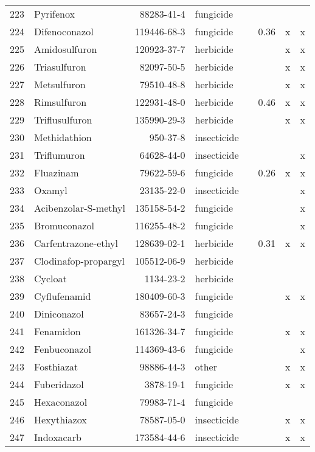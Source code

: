 \begin{longtable}{lp{4cm}rlp{1cm}p{1.5cm}p{1.5cm}p{1cm}}
  223 & Pyrifenox & 88283-41-4 & fungicide &  &  &  &  \\ 
  224 & Difenoconazol & 119446-68-3 & fungicide &  & 0.36 & x & x \\ 
  225 & Amidosulfuron & 120923-37-7 & herbicide &  &  & x & x \\ 
  226 & Triasulfuron & 82097-50-5 & herbicide &  &  & x & x \\ 
  227 & Metsulfuron & 79510-48-8 & herbicide &  &  & x & x \\ 
  228 & Rimsulfuron & 122931-48-0 & herbicide &  & 0.46 & x & x \\ 
  229 & Triflusulfuron & 135990-29-3 & herbicide &  &  & x & x \\ 
  230 & Methidathion & 950-37-8 & insecticide &  &  &  &  \\ 
  231 & Triflumuron & 64628-44-0 & insecticide &  &  &  & x \\ 
  232 & Fluazinam & 79622-59-6 & fungicide &  & 0.26 & x & x \\ 
  233 & Oxamyl & 23135-22-0 & insecticide &  &  &  & x \\ 
  234 & Acibenzolar-S-methyl & 135158-54-2 & fungicide &  &  &  & x \\ 
  235 & Bromuconazol & 116255-48-2 & fungicide &  &  &  & x \\ 
  236 & Carfentrazone-ethyl & 128639-02-1 & herbicide &  & 0.31 & x & x \\ 
  237 & Clodinafop-propargyl & 105512-06-9 & herbicide &  &  &  &  \\ 
  238 & Cycloat & 1134-23-2 & herbicide &  &  &  &  \\ 
  239 & Cyflufenamid & 180409-60-3 & fungicide &  &  & x & x \\ 
  240 & Diniconazol & 83657-24-3 & fungicide &  &  &  &  \\ 
  241 & Fenamidon & 161326-34-7 & fungicide &  &  & x & x \\ 
  242 & Fenbuconazol & 114369-43-6 & fungicide &  &  &  & x \\ 
  243 & Fosthiazat & 98886-44-3 & other &  &  & x & x \\ 
  244 & Fuberidazol & 3878-19-1 & fungicide &  &  & x & x \\ 
  245 & Hexaconazol & 79983-71-4 & fungicide &  &  &  &  \\ 
  246 & Hexythiazox & 78587-05-0 & insecticide &  &  & x & x \\ 
  247 & Indoxacarb & 173584-44-6 & insecticide &  &  & x & x \\ 

\end{longtable}
